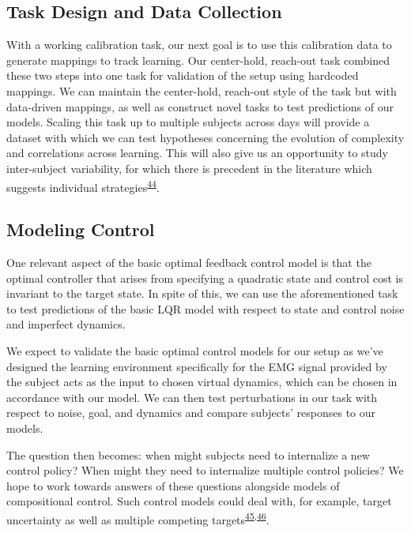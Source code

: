\documentclass[
  a4paper,
]{article}
\begin{document}
\hypertarget{task-design-and-data-collection}{%
\subsection{Task Design and Data
Collection}\label{task-design-and-data-collection}}

With a working calibration task, our next goal is to use this
calibration data to generate mappings to track learning. Our
center-hold, reach-out task combined these two steps into one task for
validation of the setup using hardcoded mappings. We can maintain the
center-hold, reach-out style of the task but with data-driven mappings,
as well as construct novel tasks to test predictions of our models.
Scaling this task up to multiple subjects across days will provide a
dataset with which we can test hypotheses concerning the evolution of
complexity and correlations across learning. This will also give us an
opportunity to study inter-subject variability, for which there is
precedent in the literature which suggests individual
strategies\textsuperscript{\protect\hyperlink{ref-crouzierIndividualDifferencesDistribution2019}{44}}.

\hypertarget{modeling-control}{%
\subsection{Modeling Control}\label{modeling-control}}

One relevant aspect of the basic optimal feedback control model is that
the optimal controller that arises from specifying a quadratic state and
control cost is invariant to the target state. In spite of this, we can
use the aforementioned task to test predictions of the basic LQR model
with respect to state and control noise and imperfect dynamics.

We expect to validate the basic optimal control models for our setup as
we've designed the learning environment specifically for the EMG signal
provided by the subject acts as the input to chosen virtual dynamics,
which can be chosen in accordance with our model. We can then test
perturbations in our task with respect to noise, goal, and dynamics and
compare subjects' responses to our models.

The question then becomes: when might subjects need to internalize a new
control policy? When might they need to internalize multiple control
policies? We hope to work towards answers of these questions alongside
models of compositional control. Such control models could deal with,
for example, target uncertainty as well as multiple competing
targets\textsuperscript{\protect\hyperlink{ref-gallivanActionPlanCooptimization2015}{45},\protect\hyperlink{ref-gallivanParallelSpecificationCompeting2016}{46}}.
\end{document}
